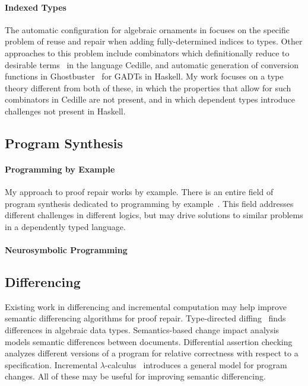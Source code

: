 \paragraph{Indexed Types}
The automatic configuration for algebraic ornaments in \toolnamec focuses on the specific problem of reuse and repair when adding fully-determined indices to types.
Other approaches to this problem include combinators which definitionally reduce to desirable terms~\cite{DBLP:journals/corr/abs-1803-08150} in the language Cedille,
and automatic generation of conversion functions in Ghostbuster~\cite{McDonell:2016:GTS:2951913.2951914} for GADTs in Haskell.
My work focuses on a type theory different from both of these, in which the properties that allow for such combinators in Cedille are not present, and in which dependent types introduce challenges not present in Haskell.

\subsection{Program Synthesis}
\label{sec:synthesis}

\paragraph{Programming by Example}
My approach to proof repair works by example.
There is an entire field of program synthesis dedicated to programming by example~\cite{DBLP:journals/ftpl/GulwaniPS17}. 
This field addresses different challenges in different logics,
but may drive solutions to similar problems in a dependently typed language.

\paragraph{Neurosymbolic Programming}

\subsection{Differencing}
\label{sec:diff-incremental}

Existing work in differencing and incremental computation may help 
improve semantic differencing algorithms for proof repair.
Type-directed diffing~\cite{Miraldo:2017:TDS:3122975.3122976}
finds differences in algebraic data types.
Semantics-based change impact analysis~\cite{Autexier:2010:SCI:1860559.1860580} models semantic differences
between documents.
Differential assertion checking~\cite{differential-assertion-checking-2} analyzes different
versions of a program for relative correctness with respect to a specification.
Incremental $\lambda$-calculus~\cite{Cai:2014:TCH:2594291.2594304} introduces a general model for program changes.
All of these may be useful for improving semantic differencing.

